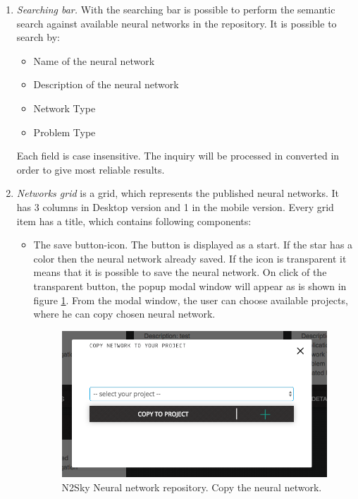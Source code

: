 \begin{enumerate}
\item \emph{Searching bar.} With the searching bar is possible to perform the semantic search against available neural networks in the repository. It is possible to search by: 
\begin{itemize}
\item Name of the neural network
\item Description of the neural network
\item Network Type
\item Problem Type
\end{itemize}

Each field is case insensitive. The inquiry will be processed in converted in order to give most reliable results. 

\item \emph{Networks grid} is a grid, which represents the published neural networks. It has 3 columns in Desktop version and 1 in the mobile version. Every grid item has a title, which contains following components:
\begin{itemize}
\item The save button-icon. The button is displayed as a start. If the star has a color then the neural network already saved. If the icon is transparent it means that it is possible to save the neural network. On click of the transparent button, the popup modal window will appear as is shown in figure \ref{fig:copy_nn}. From the modal window, the user can choose available projects, where he can copy chosen neural network. 


\begin{figure}[htbp]
\begin{center}
  \includegraphics[scale=0.5]{components/5/img/copy_nn.png}
  \caption{N2Sky Neural network repository. Copy the neural network.}
  \label{fig:copy_nn}
\end{center}
\end{figure}


\end{itemize}
\end{enumerate}
